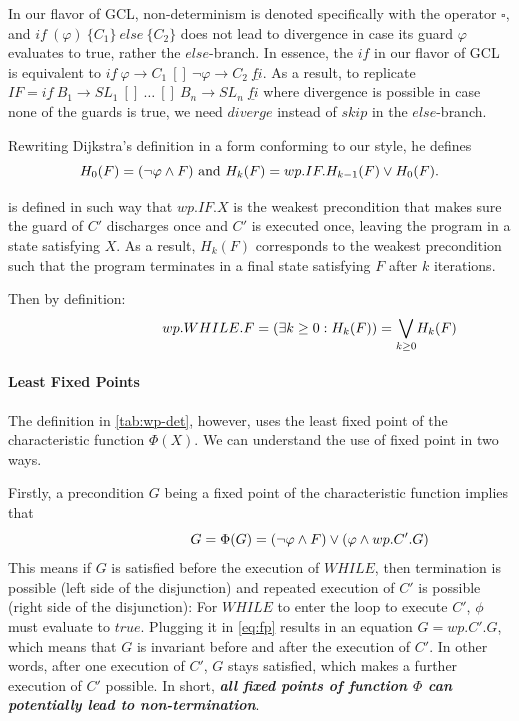 In our flavor of GCL, non-determinism is denoted specifically with the operator $\square$, and $if\ (\varphi)\ \{C_1\}\ else\ \{C_2\}$ does not lead to divergence in case its guard $\varphi$ evaluates to true, rather the $else$-branch. 
In essence, the $if$ in our flavor of GCL is equivalent to $\underline{if}\ \varphi \to C_1\ []\ \neg \varphi\to C_2\ \underline{fi}$. 
As a result, to replicate $IF=\underline{if}\ B_1 \to SL_1 \ []\ \dots\ []\ B_n\to SL_n\ \underline{fi}$ where divergence is possible in case none of the guards is true, we need $diverge$ instead of $skip$ in the $else$-branch. 

Rewriting Dijkstra's definition in a form conforming to our style, he defines 
\[
H_0(F)=( \neg \varphi\wedge F )
\\\text{ and } \\ 
H_k(F)=wp.IF.H_{k-1}(F) \vee H_0(F). 
\]

 is defined in such way that $wp.IF.X$ is the weakest precondition that makes sure the guard of $C'$ discharges once and $C'$ is executed once, leaving the program in a state satisfying $X$.
As a result, $H_k(F)$ corresponds to the weakest precondition such that the program terminates in a final state satisfying $F$ after  $k$ iterations.



Then by definition: 
\begin{equation}
  \hspace{2.5cm}
  wp.WHILE.F=(\exists k\geq 0: H_k(F)) = \underset{k\geq 0}{\bigvee} H_k(F) \label{eq:while}
\end{equation}

\paragraph{Least Fixed Points}
The definition in \autoref{tab:wp-det}, however, uses the least fixed point of the characteristic function $\Phi(X)$. 
We can understand the use of fixed point in two ways. 

Firstly, a precondition $G$ being a fixed point of the characteristic function implies that 
\begin{equation}
  \hspace{2.5cm}
  G= \Phi(G)=(\neg\varphi\wedge F)\vee(\varphi\wedge wp.C'.G) \label{eq:fp}
\end{equation}
This means if $G$ is satisfied before the execution of $WHILE$, then termination is possible (left side of the disjunction) and repeated execution of $C'$ is possible (right side of the disjunction):
For $WHILE$ to enter the loop to execute $C'$, $\phi$ must evaluate to $true$.
Plugging it in \autoref{eq:fp} results in an equation $G=wp.C'.G$, which means that $G$ is invariant before and after the execution of $C'$. 
In other words, after one execution of $C'$, $G$ stays satisfied, which makes a further execution of $C'$ possible.
In short, \textbf{\textit{all fixed points of function $\Phi$ can potentially lead to non-termination}}. 

